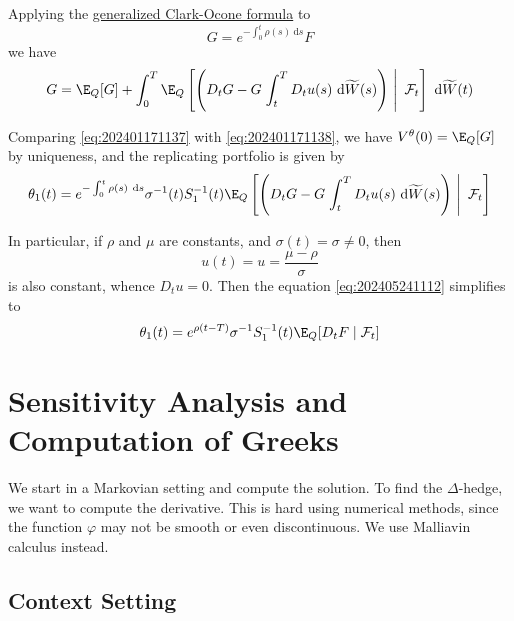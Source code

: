 Applying the \hyperref[thm:clark-ocone-change-measure]{generalized Clark-Ocone formula} to 
\[G = e^{-\int_0^t \rho(s) ~\mathrm{d}s} F\] we have
\begin{equation}\label{eq:202401171138}
G = \E_Q[G] + \int_0^T \E_Q \left[ \left( D_t G - G \left. \int_t^T D_t u(s) ~\mathrm{d}\widetilde{W}(s) \right) ~ \right| ~ \mathcal{F}_t \right] ~\mathrm{d}\widetilde{W}(t)
\end{equation}

Comparing \eqref{eq:202401171137} with \eqref{eq:202401171138}, we have $V^\theta(0) = \E_Q[G]$ by uniqueness, and the replicating portfolio is given by
\begin{equation}\label{eq:202405241112}
\theta_1(t) = e^{-\int_0^t \rho(s) ~\mathrm{d}s} \sigma^{-1}(t) S_1^{-1}(t) \E_Q \left[ \left( D_t G - G \left. \int_t^T D_t u(s) ~\mathrm{d}\widetilde{W}(s) \right) ~ \right| ~ \mathcal{F}_t \right]
\end{equation}

In particular, if $\rho$ and $\mu$ are constants, and $\sigma(t) = \sigma \neq 0$, then
\[
u(t) = u = \frac{\mu - \rho}{\sigma}
\]
is also constant, whence $D_t u = 0$. Then the equation \eqref{eq:202405241112} simplifies to
\begin{equation}\label{eq:202406031637}
\theta_1(t) = e^{\rho(t-T)} \sigma^{-1} S_1^{-1}(t) \E_Q [ D_t F \mid \mathcal{F}_t ]
\end{equation}

%
%
% 

\section{Sensitivity Analysis and Computation of Greeks}\label{sensitivity-analysis}

We start in a Markovian setting and compute the solution. To find the $\Delta$-hedge, we want to compute the derivative. This is hard using numerical methods, since the function $\varphi$ may not be smooth or even discontinuous. We use Malliavin calculus instead. 

\subsection*{Context Setting}

